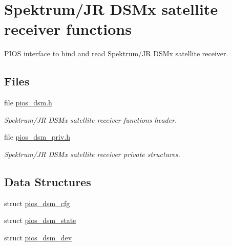 \hypertarget{group___p_i_o_s___d_s_m}{\section{Spektrum/\-J\-R D\-S\-Mx satellite receiver functions}
\label{group___p_i_o_s___d_s_m}
}


P\-I\-O\-S interface to bind and read Spektrum/\-J\-R D\-S\-Mx satellite receiver.  


\subsection*{Files}
\begin{DoxyCompactItemize}
\item 
file \hyperlink{pios__dsm_8h}{pios\-\_\-dsm.\-h}
\begin{DoxyCompactList}\small\item\em Spektrum/\-J\-R D\-S\-Mx satellite receiver functions header. \end{DoxyCompactList}\item 
file \hyperlink{pios__dsm__priv_8h}{pios\-\_\-dsm\-\_\-priv.\-h}
\begin{DoxyCompactList}\small\item\em Spektrum/\-J\-R D\-S\-Mx satellite receiver private structures. \end{DoxyCompactList}\end{DoxyCompactItemize}
\subsection*{Data Structures}
\begin{DoxyCompactItemize}
\item 
struct \hyperlink{structpios__dsm__cfg}{pios\-\_\-dsm\-\_\-cfg}
\item 
struct \hyperlink{structpios__dsm__state}{pios\-\_\-dsm\-\_\-state}
\item 
struct \hyperlink{structpios__dsm__dev}{pios\-\_\-dsm\-\_\-dev}
\end{DoxyCompactItemize}
